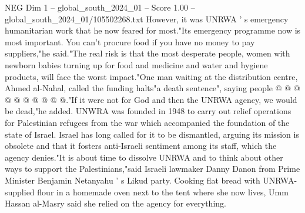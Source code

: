 \begin{textsample}{NEG Dim 1 – global\_south\_2024\_01 – Score 1.00 – global\_south\_2024\_01/105502268.txt}
However, it was UNRWA ' s emergency humanitarian work that he now feared for most."Its emergency programme now is most important.
You can't procure food if you have no money to pay suppliers,"he said."The real risk is that the most desperate people, women with newborn babies turning up for food and medicine and water and hygiene products, will face the worst impact."One man waiting at the distribution centre, Ahmed al-Nahal, called the funding halts"a death sentence", saying people @ @ @ @ @ @ @ @ @ @."If it were not for God and then the UNRWA agency, we would be dead,"he added.
UNWRA was founded in 1948 to carry out relief operations for Palestinian refugees from the war which accompanied the foundation of the state of Israel.
Israel has long called for it to be dismantled, arguing its mission is obsolete and that it fosters anti-Israeli sentiment among its staff, which the agency denies."It is about time to dissolve UNRWA and to think about other ways to support the Palestinians,"said Israeli lawmaker Danny Danon from Prime Minister Benjamin Netanyahu ' s Likud party.
Cooking flat bread with UNRWA-supplied flour in a homemade oven next to the tent where she now lives, Umm Hassan al-Masry said she relied on the agency for everything.

\end{textsample}
